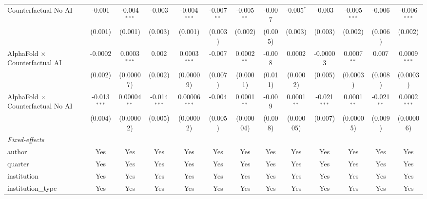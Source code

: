 \begin{tabular}{lcccccccccccc}
   Counterfactual No AI                     & -0.001         & -0.004$^{***}$ & -0.003         & -0.004$^{***}$  & -0.007$^{**}$ & -0.005$^{**}$ & -0.007  & -0.005$^{*}$  & -0.003         & -0.005$^{***}$ & -0.006         & -0.006$^{***}$\\   
                                            & (0.001)        & (0.001)        & (0.003)        & (0.001)         & (0.003)       & (0.002)       & (0.005) & (0.003)       & (0.003)        & (0.002)        & (0.006)        & (0.002)\\   
   AlphaFold $\times$ Counterfactual AI     & -0.0002        & 0.0003$^{***}$ & 0.002          & 0.0003$^{***}$  & -0.007        & 0.0002$^{**}$ & -0.008  & 0.0002        & -0.00003       & 0.0007$^{**}$  & 0.007          & 0.0009$^{***}$\\   
                                            & (0.002)        & (0.00007)      & (0.002)        & (0.00009)       & (0.007)       & (0.0001)      & (0.011) & (0.0002)      & (0.005)        & (0.0003)       & (0.008)        & (0.0003)\\   
   AlphaFold $\times$ Counterfactual No AI  & -0.013$^{***}$ & 0.00004$^{**}$ & -0.014$^{***}$ & 0.00006$^{***}$ & -0.004        & 0.0001$^{**}$ & -0.009  & 0.0001$^{**}$ & -0.021$^{***}$ & 0.0001$^{**}$  & -0.021$^{**}$  & 0.0002$^{***}$\\   
                                            & (0.004)        & (0.00002)      & (0.005)        & (0.00002)       & (0.005)       & (0.00004)     & (0.008) & (0.00005)     & (0.007)        & (0.00005)      & (0.009)        & (0.00006)\\   
   \midrule
   \emph{Fixed-effects}\\
   author                                   & Yes            & Yes            & Yes            & Yes             & Yes           & Yes           & Yes     & Yes           & Yes            & Yes            & Yes            & Yes\\  
   quarter                                  & Yes            & Yes            & Yes            & Yes             & Yes           & Yes           & Yes     & Yes           & Yes            & Yes            & Yes            & Yes\\  
   institution                              & Yes            & Yes            & Yes            & Yes             & Yes           & Yes           & Yes     & Yes           & Yes            & Yes            & Yes            & Yes\\  
   institution\_type                        & Yes            & Yes            & Yes            & Yes             & Yes           & Yes           & Yes     & Yes           & Yes            & Yes            & Yes            & Yes\\  

\end{tabular}
